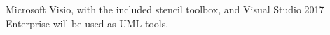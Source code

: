Microsoft Visio, with the included stencil toolbox, and Visual Studio 2017 Enterprise will be used as UML tools.












